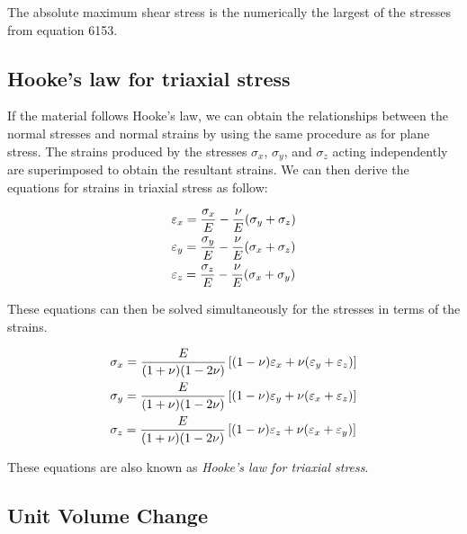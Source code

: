 \documentclass[
10pt,
a4paper,
openany,
svgnames,
]{kaobook} %
\begin{document}
The absolute maximum shear stress is the numerically the largest of the stresses from equation 6153.

\subsection{Hooke’s law for triaxial stress}

If the material follows Hooke’s law, we can obtain the relationships between the normal stresses and normal strains by using the same procedure as for plane stress. The strains produced by the stresses $\sigma_x$, $\sigma_y$, and $\sigma_z$ acting independently are superimposed to obtain the resultant strains. We can then derive the equations for strains in triaxial stress as follow:

\begin{equation}
  \begin{gathered}
    \varepsilon_x = \frac{\sigma_x}{E} - \frac{\nu }{E}(\sigma_y + \sigma_z) \hfill \\
    \varepsilon_y = \frac{\sigma_y}{E} - \frac{\nu }{E}(\sigma_x + \sigma_z) \hfill \\
    \varepsilon_z = \frac{\sigma_z}{E} - \frac{\nu }{E}(\sigma_x + \sigma_y) \hfill 
  \end{gathered}
\end{equation}

These equations can then be solved simultaneously for the stresses in terms of the strains.

\begin{equation}
  \begin{gathered}
    \sigma_x = \frac{E}{(1 + \nu )(1 - 2\nu )}\left[ (1 - \nu )\varepsilon_x + \nu (\varepsilon_y + \varepsilon_z) \right] \hfill \\
    \sigma_y = \frac{E}{(1 + \nu )(1 - 2\nu )}\left[ (1 - \nu )\varepsilon_y + \nu (\varepsilon_x + \varepsilon_z) \right] \hfill \\
    \sigma_z = \frac{E}{(1 + \nu )(1 - 2\nu )}\left[ (1 - \nu )\varepsilon_z + \nu (\varepsilon_x + \varepsilon_y) \right] \hfill \\ 
  \end{gathered}
\end{equation}

These equations are also known as \emph{Hooke’s law for triaxial stress}.

\subsection{Unit Volume Change}
\end{document}

